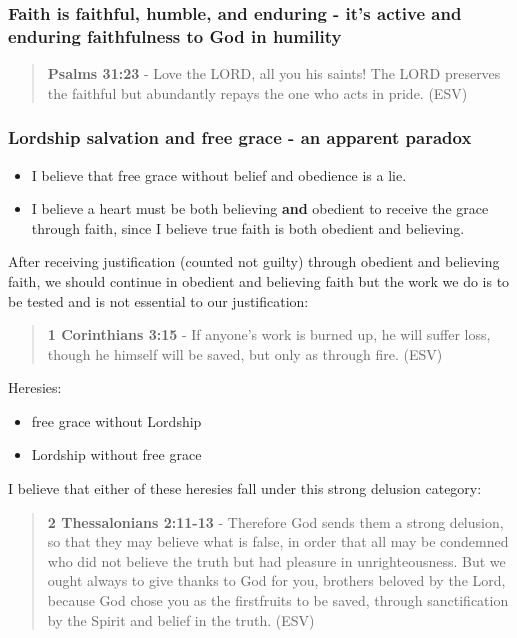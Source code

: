 \documentclass[11pt]{article}
\begin{document}
\subsubsection{Faith is faithful, humble, and enduring - it's active and enduring faithfulness to God in humility}
\label{sec:orgc1aaaf5}
\begin{quote}
\textbf{Psalms 31:23} - Love the LORD, all you his saints! The LORD preserves the faithful but abundantly repays the one who acts in pride. (ESV)
\end{quote}

\subsubsection{Lordship salvation and free grace - an apparent paradox}
\label{sec:org6a988ad}
\begin{itemize}
\item I believe that free grace without belief and obedience is a lie.
\item I believe a heart must be both believing \textbf{and} obedient to receive the grace through faith, since I believe true faith is both obedient and believing.
\end{itemize}

After receiving justification (counted not guilty) through obedient and believing faith, we should continue in obedient and believing faith but the work we do is to be tested and is not essential to our justification:

\begin{quote}
\textbf{1 Corinthians 3:15} - If anyone's work is burned up, he will suffer loss, though he himself will be saved, but only as through fire. (ESV)
\end{quote}

Heresies:
\begin{itemize}
\item free grace without Lordship
\item Lordship without free grace
\end{itemize}

I believe that either of these heresies fall under this strong delusion category:

\begin{quote}
\textbf{2 Thessalonians 2:11-13} - Therefore God sends them a strong delusion, so that they may believe what is false, in order that all may be condemned who did not believe the truth but had pleasure in unrighteousness.  But we ought always to give thanks to God for you, brothers beloved by the Lord, because God chose you as the firstfruits to be saved, through sanctification by the Spirit and belief in the truth.  (ESV)
\end{quote}
\end{document}
